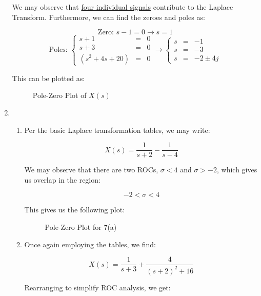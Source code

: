 \begin{enumerate}
      We may observe that \underline{four individual signals} contribute to the Laplace Transform. Furthermore, we can find the zeroes and poles as:

      $$\boxed{\text{Zero: }s-1=0\to s=1}$$
      $$\boxed{\text{Poles: }\left\{\begin{array}{lll} s+1&=&0\\s+3&=&0\\(s^2+4s+20)&=&0\end{array}\to\left\{\begin{array}{lll} s&=&-1\\s&=&-3\\s&=&-2\pm4j\end{array}}$$

          This can be plotted as:

          \begin{figure}[H]
            \centering
            
            \caption{Pole-Zero Plot of $X(s)$}
            \label{fig:1}
          \end{figure}

  \item

    \begin{enumerate}

      \item 

        Per the basic Laplace transformation tables, we may write:

        $$\boxed{X(s)=\frac{1}{s+2}-\frac{1}{s-4}}$$

        We may observe that there are two ROCs, $\sigma<4$ and $\sigma>-2$, which gives us overlap in the region:

        $$\boxed{-2<\sigma<4}$$

        This gives us the following plot:

        \begin{figure}[H]
          \centering
          
          \caption{Pole-Zero Plot for 7(a)}
          \label{fig:2}
        \end{figure}

      \item 

        Once again employing the tables, we find:

        $$X(s)=\frac{1}{s+3}+\frac{4}{(s+2)^2+16}$$

        Rearranging to simplify ROC analysis, we get:


\end{enumerate}
\end{enumerate}
